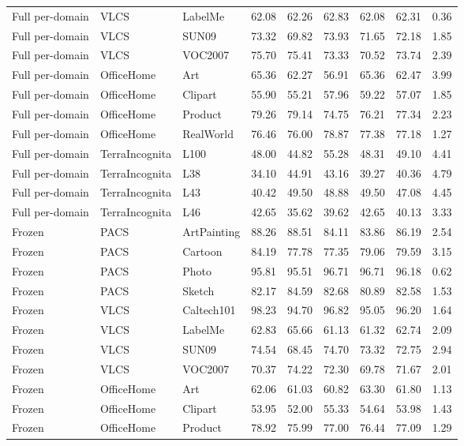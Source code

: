 \begin{longtable}{lllrrrrrr}
Full per-domain & VLCS & LabelMe & 62.08 & 62.26 & 62.83 & 62.08 & 62.31 & 0.36 \\
Full per-domain & VLCS & SUN09 & 73.32 & 69.82 & 73.93 & 71.65 & 72.18 & 1.85 \\
Full per-domain & VLCS & VOC2007 & 75.70 & 75.41 & 73.33 & 70.52 & 73.74 & 2.39 \\
Full per-domain & OfficeHome & Art & 65.36 & 62.27 & 56.91 & 65.36 & 62.47 & 3.99 \\
Full per-domain & OfficeHome & Clipart & 55.90 & 55.21 & 57.96 & 59.22 & 57.07 & 1.85 \\
Full per-domain & OfficeHome & Product & 79.26 & 79.14 & 74.75 & 76.21 & 77.34 & 2.23 \\
Full per-domain & OfficeHome & RealWorld & 76.46 & 76.00 & 78.87 & 77.38 & 77.18 & 1.27 \\
Full per-domain & TerraIncognita & L100 & 48.00 & 44.82 & 55.28 & 48.31 & 49.10 & 4.41 \\
Full per-domain & TerraIncognita & L38 & 34.10 & 44.91 & 43.16 & 39.27 & 40.36 & 4.79 \\
Full per-domain & TerraIncognita & L43 & 40.42 & 49.50 & 48.88 & 49.50 & 47.08 & 4.45 \\
Full per-domain & TerraIncognita & L46 & 42.65 & 35.62 & 39.62 & 42.65 & 40.13 & 3.33 \\
Frozen & PACS & ArtPainting & 88.26 & 88.51 & 84.11 & 83.86 & 86.19 & 2.54 \\
Frozen & PACS & Cartoon & 84.19 & 77.78 & 77.35 & 79.06 & 79.59 & 3.15 \\
Frozen & PACS & Photo & 95.81 & 95.51 & 96.71 & 96.71 & 96.18 & 0.62 \\
Frozen & PACS & Sketch & 82.17 & 84.59 & 82.68 & 80.89 & 82.58 & 1.53 \\
Frozen & VLCS & Caltech101 & 98.23 & 94.70 & 96.82 & 95.05 & 96.20 & 1.64 \\
Frozen & VLCS & LabelMe & 62.83 & 65.66 & 61.13 & 61.32 & 62.74 & 2.09 \\
Frozen & VLCS & SUN09 & 74.54 & 68.45 & 74.70 & 73.32 & 72.75 & 2.94 \\
Frozen & VLCS & VOC2007 & 70.37 & 74.22 & 72.30 & 69.78 & 71.67 & 2.01 \\
Frozen & OfficeHome & Art & 62.06 & 61.03 & 60.82 & 63.30 & 61.80 & 1.13 \\
Frozen & OfficeHome & Clipart & 53.95 & 52.00 & 55.33 & 54.64 & 53.98 & 1.43 \\
Frozen & OfficeHome & Product & 78.92 & 75.99 & 77.00 & 76.44 & 77.09 & 1.29 \\

\end{longtable}
